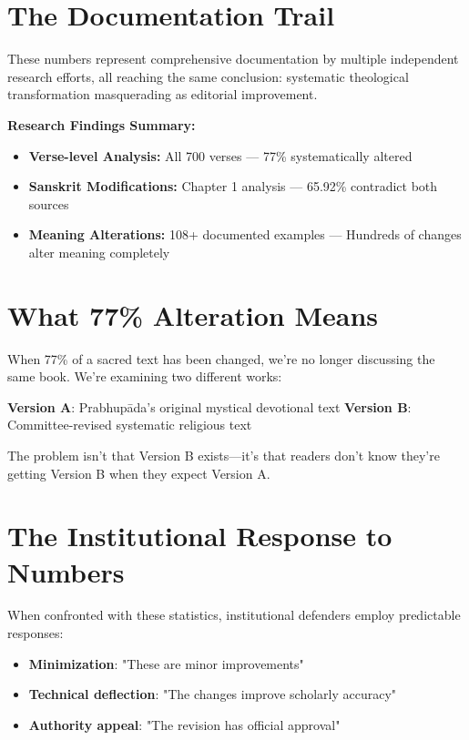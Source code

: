 \documentclass[11pt,twoside]{book}
\begin{document}
\section*{The Documentation Trail}
\label{sec:org2ff5597}

These numbers represent comprehensive documentation by multiple independent research efforts, all reaching the same conclusion: systematic theological transformation masquerading as editorial improvement.

\textbf{\textbf{Research Findings Summary:}}

\begin{itemize}
\item \textbf{\textbf{Verse-level Analysis:}} All 700 verses — 77\% systematically altered
\item \textbf{\textbf{Sanskrit Modifications:}} Chapter 1 analysis — 65.92\% contradict both sources
\item \textbf{\textbf{Meaning Alterations:}} 108+ documented examples — Hundreds of changes alter meaning completely
\end{itemize}
\section*{What 77\% Alteration Means}
\label{sec:org3bae2f5}

When 77\% of a sacred text has been changed, we're no longer discussing the same book. We're examining two different works:

\textbf{\textbf{Version A}}: Prabhupāda's original mystical devotional text
\textbf{\textbf{Version B}}: Committee-revised systematic religious text

The problem isn't that Version B exists—it's that readers don't know they're getting Version B when they expect Version A.
\section*{The Institutional Response to Numbers}
\label{sec:org912b9cb}

When confronted with these statistics, institutional defenders employ predictable responses:

\begin{itemize}
\item \textbf{\textbf{Minimization}}: "These are minor improvements"
\item \textbf{\textbf{Technical deflection}}: "The changes improve scholarly accuracy"
\item \textbf{\textbf{Authority appeal}}: "The revision has official approval"
\end{itemize}
\end{document}
